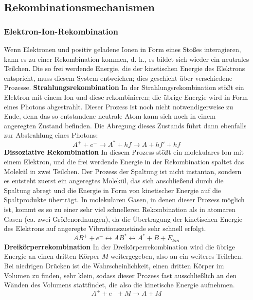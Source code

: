 \subsection{Rekombinationsmechanismen}
\subsubsection{Elektron-Ion-Rekombination}
Wenn Elektronen und positiv geladene Ionen in Form eines Stoßes interagieren, kann es zu einer Rekombination kommen, d. h., es bildet sich wieder ein neutrales Teilchen. Die so frei werdende Energie, die der kinetischen Energie des Elektrons entspricht, muss diesem System entweichen; dies geschieht über verschiedene Prozesse.\newline\newline
\textbf{Strahlungsrekombination}
In der Strahlungsrekombination stößt ein Elektron mit einem Ion und diese rekombinieren; die übrige Energie wird in Form eines Photons abgestrahlt. Dieser Prozess ist noch nicht notwendigerweise zu Ende, denn das so entstandene neutrale Atom kann sich noch in einem angeregten Zustand befinden. Die Abregung dieses Zustands führt dann ebenfalls zur Abstrahlung eines Photons:
\begin{equation}
    A^+ + e^- \rightarrow A^* + hf \rightarrow A + hf' + hf
    \label{eq:radiationrecombination}
\end{equation}\newline
\textbf{Dissoziative Rekombination}
In diesem Prozess stößt ein molekulares Ion mit einem Elektron, und die frei werdende Energie in der Rekombination spaltet das Molekül in zwei Teilchen. Der Prozess der Spaltung ist nicht instantan, sondern es entsteht zuerst ein angeregtes Molekül, das sich anschließend durch die Spaltung abregt und die Energie in Form von kinetischer Energie auf die Spaltprodukte überträgt. In molekularen Gasen, in denen dieser Prozess möglich ist, kommt es so zu einer sehr viel schnelleren Rekombination als in atomaren Gasen (ca. zwei Größenordnungen), da die Übertragung der kinetischen Energie des Elektrons auf angeregte Vibrationszustände sehr schnell erfolgt.
\begin{equation}
    AB^+ + e^- \leftrightarrow AB^* \leftrightarrow A^* + B + E_{kin}
\end{equation}\newline
\textbf{Dreikörperrekombination}
In der Dreikörperrekombination wird die übrige Energie an einen dritten Körper \(M\) weitergegeben, also an ein weiteres Teilchen. Bei niedrigen Drücken ist die Wahrscheinlichkeit, einen dritten Körper im Volumen zu finden, sehr klein, sodass dieser Prozess fast ausschließlich an den Wänden des Volumens stattfindet, die also die kinetische Energie aufnehmen.
\begin{equation}
    A^+ + e^- + M \rightarrow A + M
\end{equation}

